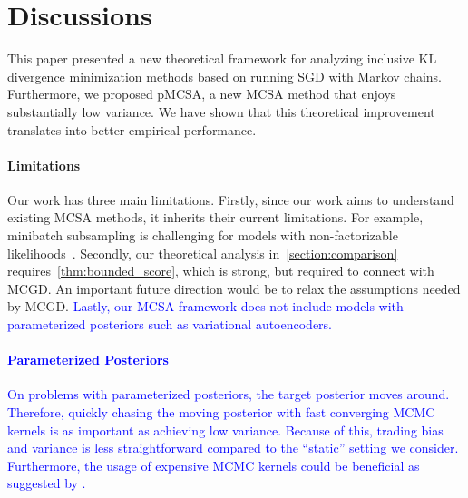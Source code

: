 
\vspace{-0.1in}
\section{Discussions}\label{section:discussion}
\vspace{-0.12in}
This paper presented a new theoretical framework for analyzing inclusive KL divergence minimization methods based on running SGD with Markov chains.
Furthermore, we proposed pMCSA, a new MCSA method that enjoys substantially low variance.
We have shown that this theoretical improvement translates into better empirical performance.

\vspace{-0.12in}
\paragraph{Limitations}
Our work has three main limitations.
Firstly, since our work aims to understand existing MCSA methods, it inherits their current limitations.
For example, minibatch subsampling is challenging for models with non-factorizable likelihoods~\citep{NEURIPS2020_b2070693}.
Secondly, our theoretical analysis in~\cref{section:comparison} requires~\cref{thm:bounded_score}, which is strong, but required to connect with MCGD.
An important future direction would be to relax the assumptions needed by MCGD.
\textcolor{blue}{%
Lastly, our MCSA framework does not include models with parameterized posteriors such as variational autoencoders.
}

\vspace{-4ex}
\textcolor{blue}{
\vspace{-0.12in}
\paragraph{Parameterized Posteriors}
On problems with parameterized posteriors, the target posterior moves around.
Therefore, quickly chasing the moving posterior with fast converging MCMC kernels is as important as achieving low variance.
Because of this, trading bias and variance is less straightforward compared to the ``static'' setting we consider.
Furthermore, the usage of expensive MCMC kernels could be beneficial as suggested by \citet{zhang_transport_2022}.
}

\vspace{-0.12in}
